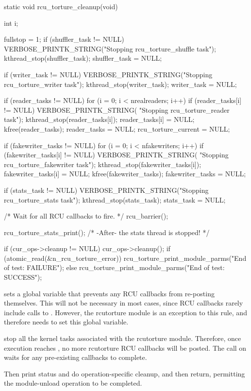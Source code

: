 \begin{fcvlabel}[ln:rcubarrier]
\begin{VerbatimN}[commandchars=\%\@\$]
	static void
	rcu_torture_cleanup(void)
	{
		int i;

		fullstop = 1;        %
		if (shuffler_task != NULL) {    %
			VERBOSE_PRINTK_STRING("Stopping rcu_torture_shuffle task");
			kthread_stop(shuffler_task);
		}
		shuffler_task = NULL;

		if (writer_task != NULL) {
			VERBOSE_PRINTK_STRING("Stopping rcu_torture_writer task");
			kthread_stop(writer_task);
		}
		writer_task = NULL;

		if (reader_tasks != NULL) {
			for (i = 0; i < nrealreaders; i++) {
				if (reader_tasks[i] != NULL) {
					VERBOSE_PRINTK_STRING(
					                     "Stopping rcu_torture_reader task");
					kthread_stop(reader_tasks[i]);
				}
				reader_tasks[i] = NULL;
			}
			kfree(reader_tasks);
			reader_tasks = NULL;
		}
		rcu_torture_current = NULL;

		if (fakewriter_tasks != NULL) {
			for (i = 0; i < nfakewriters; i++) {
				if (fakewriter_tasks[i] != NULL) {
					VERBOSE_PRINTK_STRING(
					                      "Stopping rcu_torture_fakewriter task");
					kthread_stop(fakewriter_tasks[i]);
				}
				fakewriter_tasks[i] = NULL;
			}
			kfree(fakewriter_tasks);
			fakewriter_tasks = NULL;
		}

		if (stats_task != NULL) {
			VERBOSE_PRINTK_STRING("Stopping rcu_torture_stats task");
			kthread_stop(stats_task);
		}
		stats_task = NULL;   %

		/* Wait for all RCU callbacks to fire. */
		rcu_barrier();   %

		rcu_torture_stats_print(); /* -After- the stats thread is stopped! */ %

		if (cur_ops->cleanup != NULL)
			cur_ops->cleanup();
		if (atomic_read(&n_rcu_torture_error))
			rcu_torture_print_module_parms("End of test: FAILURE");
		else
			rcu_torture_print_module_parms("End of test: SUCCESS");  %
	}
\end{VerbatimN}
\end{fcvlabel}

\begin{fcvref}[ln:rcubarrier]
 sets a global variable that prevents any RCU callbacks from
re-posting themselves.
This will not be necessary in most cases, since
RCU callbacks rarely include calls to .
However, the rcutorture
module is an exception to this rule, and therefore needs to set this
global variable.

stop all the kernel tasks associated with the rcutorture
module.
Therefore, once execution reaches , %
no more rcutorture
RCU callbacks will be posted. The  call on  %
waits
for any pre-existing callbacks to complete.

Then  %
print status and do operation-specific cleanup, and
then return, permitting the module-unload operation to be completed.
\end{fcvref}

